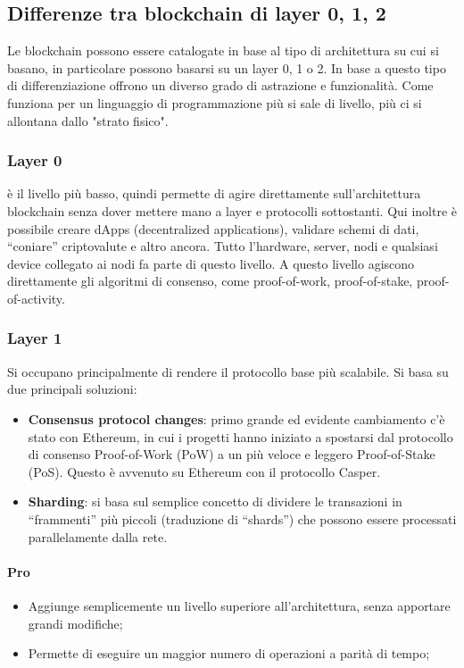 \subsection{Differenze tra blockchain di layer 0, 1, 2}
Le blockchain possono essere catalogate in base al tipo di architettura su cui si basano, in particolare possono basarsi su un layer 0, 1 o 2.
In base a questo tipo di differenziazione offrono un diverso grado di astrazione e funzionalità. Come funziona per un linguaggio di programmazione
più si sale di livello, più ci si allontana dallo "strato fisico".
    
    \subsubsection{Layer 0}
    è il livello più basso, quindi permette di agire direttamente sull’architettura blockchain senza dover mettere mano a layer e protocolli sottostanti. 
    Qui inoltre è possibile creare dApps (decentralized applications), validare schemi di dati, “coniare” criptovalute e altro ancora.
    Tutto l’hardware, server, nodi e qualsiasi device collegato ai nodi fa parte di questo livello. 
    A questo livello agiscono direttamente gli algoritmi di consenso, come proof-of-work, proof-of-stake, proof-of-activity.

    \subsubsection{Layer 1}
    Si occupano principalmente di rendere il protocollo base più scalabile. Si basa su due principali soluzioni:
    \begin{itemize}
        \item \textbf{Consensus protocol changes}: primo grande ed evidente cambiamento c’è stato con Ethereum, in cui i progetti hanno iniziato a spostarsi 
        dal protocollo di consenso Proof-of-Work (PoW) a un più veloce e leggero Proof-of-Stake (PoS). Questo è avvenuto su Ethereum con il protocollo Casper.
        \item \textbf{Sharding}: si basa sul semplice concetto di dividere le transazioni in “frammenti” più piccoli (traduzione di “shards”) che possono essere 
        processati parallelamente dalla rete.
    \end{itemize}
    \paragraph{Pro}
    \begin{itemize}
        \item Aggiunge semplicemente un livello superiore all’architettura, senza apportare grandi modifiche;
        \item Permette di eseguire un maggior numero di operazioni a parità di tempo;
    \end{itemize}
